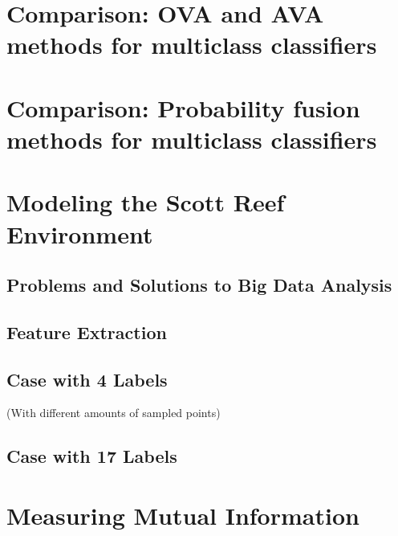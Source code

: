 	\section{Comparison: OVA and AVA methods for multiclass classifiers}
	
	\section{Comparison: Probability fusion methods for multiclass classifiers}
	
%			
%			
			
	\section{Modeling the Scott Reef Environment}
	
		\subsection{Problems and Solutions to Big Data Analysis}
		
		\subsection{Feature Extraction}
		
		\subsection{Case with 4 Labels}
		
			(With different amounts of sampled points)
			
		\subsection{Case with 17 Labels}
		
	\section{Measuring Mutual Information}
	
